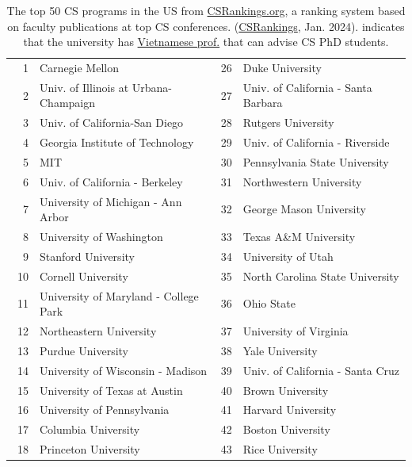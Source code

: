 \documentclass[oneside,11pt,dvipsnames]{book}
\newcommand{\red}[1]{{\color{red}{#1}}}
\begin{document}
\begin{table}[h]
  \centering
  \small
  \caption{The top 50 CS programs in the US from \href{https://www.csrankings.org}{CSRankings.org}, a ranking system  based on faculty publications at top CS conferences. (\href{https://csrankings.org}{CSRankings}, Jan. 2024). \red{$^*$} indicates that the university has \href{https://github.com/dynaroars/dynaroars.github.io/wiki/Viet-CS-Profs-US}{Vietnamese prof.} that can advise CS PhD students.}\label{tab:ranking}
  \begin{tabular}{rl|rl}
    \toprule
    1 & Carnegie Mellon & 26 & Duke University \\
    2 & Univ. of Illinois at Urbana-Champaign\red{$^*$}  & 27 & Univ. of California - Santa Barbara \\
    3 & Univ. of California-San Diego & 28 & Rutgers University\red{$^*$} \\
    4 & Georgia Institute of Technology & 29 & Univ. of California - Riverside\\
    5 & MIT                            & 30 & Pennsylvania State University  \\
    6 & Univ. of California - Berkeley& 31 & Northwestern University\\
    7 & University of Michigan - Ann Arbor\red{$^*$}   & 32& George Mason University\red{$^*$}\\
    8 & University of Washington      &33 &  Texas A\&M University\red{$^*$} \\
    9 &  Stanford University  &34&  University of Utah \\
    10 & Cornell University  & 35 &  North Carolina State University\\\
    11 & University of Maryland - College Park &  36& Ohio State \\
    12 & Northeastern University\red{$^*$} &37& University of Virginia  \\
    13 & Purdue University &38& Yale University \\
    14 & University of Wisconsin - Madison\red{$^*$} &39 & Univ. of California - Santa Cruz \\
    15 & University of Texas at Austin &40& Brown University \\
    16 & University of Pennsylvania &41 & Harvard University \\
    17 & Columbia University\red{$^*$} &42 & Boston University  \\
    18 & Princeton University\red{$^*$}  & 43& Rice University\\

\end{tabular}
\end{table}
\end{document}
